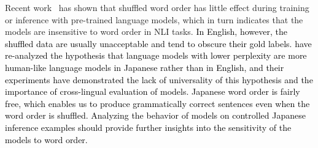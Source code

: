 \documentclass[11pt]{article}
\newcommand{\todo}[1]{\textcolor{black}{#1}}
\begin{document}
Recent work~\cite{sinha2021masked,sinha2021unnat,DBLP:conf/aaai/GuptaKS21,pham-etal-2021-order} has shown that shuffled word order has little effect during training or inference with pre-trained language models, which in turn indicates that the models are insensitive to word order in NLI tasks.
\todo{In English, however, the shuffled data are usually unacceptable and tend to obscure their gold labels.
\citet{kuribayashi-etal-2021-lower} have re-analyzed the hypothesis that language models with lower perplexity are more human-like language models in Japanese rather than in English, and their experiments have demonstrated the lack of universality of this hypothesis and the importance of cross-lingual evaluation of models.
Japanese word order is fairly free, which enables us to produce grammatically correct sentences even when the word order is shuffled.
Analyzing the behavior of models on controlled Japanese inference examples should provide further insights into the sensitivity of the models to word order.}
\end{document}
